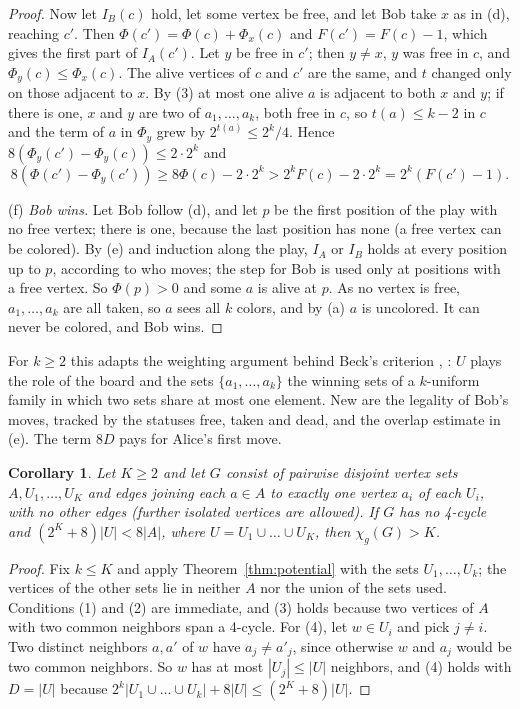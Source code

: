 \documentclass[11pt]{article}
\newtheorem{corollary}[theorem]{Corollary}
\theoremstyle{remark}
\begin{document}
\begin{proof}
Now let $I_B(c)$ hold, let some vertex be free, and let Bob take $x$ as in
(d), reaching $c'$. Then $\Phi(c')=\Phi(c)+\Phi_x(c)$ and
$F(c')=F(c)-1$, which gives the first part of $I_A(c')$. Let $y$ be free in
$c'$; then $y\ne x$, $y$ was free in $c$, and $\Phi_y(c)\le\Phi_x(c)$. The
alive vertices of $c$ and $c'$ are the same, and $t$ changed only on those
adjacent to $x$. By (3) at most one alive $a$ is adjacent to both $x$ and
$y$; if there is one, $x$ and $y$ are two of $a_1,\dots,a_k$, both free in
$c$, so $t(a)\le k-2$ in $c$ and the term of $a$ in $\Phi_y$ grew by
$2^{t(a)}\le2^k/4$. Hence $8(\Phi_y(c')-\Phi_y(c))\le2\cdot2^k$ and
\[
8(\Phi(c')-\Phi_y(c'))\ge8\Phi(c)-2\cdot2^k>2^kF(c)-2\cdot2^k
=2^k(F(c')-1).
\]

(f) \emph{Bob wins.} Let Bob follow (d), and let $p$ be the first position
of the play with no free vertex; there is one, because the last position
has none (a free vertex can be colored). By (e) and induction along the
play, $I_A$ or $I_B$ holds at every position up to $p$, according to who
moves; the step for Bob is used only at positions with a free vertex. So
$\Phi(p)>0$ and some $a$ is alive at $p$. As no vertex is free,
$a_1,\dots,a_k$ are all taken, so $a$ sees all $k$ colors, and by (a) $a$
is uncolored. It can never be colored, and Bob wins.
\end{proof}

For $k\ge2$ this adapts the weighting argument behind Beck's criterion
\cite{Be}, \cite[Theorem~4.3]{Kr}: $U$ plays the role of the board and the
sets $\{a_1,\dots,a_k\}$ the winning sets of a $k$-uniform family in which
two sets share at most one element. New are the legality of Bob's moves,
tracked by the statuses free, taken and dead, and the overlap estimate
in (e). The term $8D$ pays for Alice's first move.

\begin{corollary}\label{cor:structure}
Let $K\ge2$ and let $G$ consist of pairwise disjoint vertex sets
$A,U_1,\dots,U_K$ and edges joining each $a\in A$ to exactly one vertex $a_i$
of each $U_i$, with no other edges (further isolated vertices are
allowed). If $G$ has no 4-cycle and $(2^K+8)|U|<8|A|$, where
$U=U_1\cup\dots\cup U_K$, then $\chi_g(G)>K$.
\end{corollary}

\begin{proof}
Fix $k\le K$ and apply Theorem~\ref{thm:potential} with the sets
$U_1,\dots,U_k$; the vertices of the other sets lie in neither $A$ nor the
union of the sets used. Conditions (1) and (2) are immediate, and (3)
holds because two vertices of $A$ with two common neighbors span a
4-cycle. For (4), let $w\in U_i$ and pick $j\ne i$. Two distinct neighbors
$a,a'$ of $w$ have $a_j\ne a'_j$, since otherwise $w$ and $a_j$ would be
two common neighbors. So $w$ has at most $|U_j|\le|U|$ neighbors, and (4)
holds with $D=|U|$ because $2^k|U_1\cup\dots\cup U_k|+8|U|\le(2^K+8)|U|$.
\end{proof}
\end{document}
